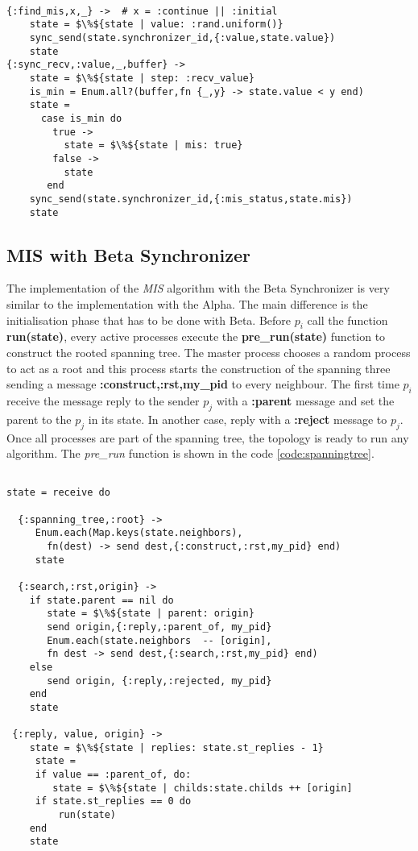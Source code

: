 \begin{lstlisting}[frame=single, columns=fullflexible, mathescape=true, caption= Synchronous communication by \textit{MIS} algorithm, label = code:sync_call]

{:find_mis,x,_} ->  # x = :continue || :initial
    state = $\%${state | value: :rand.uniform()}
    sync_send(state.synchronizer_id,{:value,state.value})
    state
{:sync_recv,:value,_,buffer} ->
    state = $\%${state | step: :recv_value}
    is_min = Enum.all?(buffer,fn {_,y} -> state.value < y end)
    state =
      case is_min do
        true ->
          state = $\%${state | mis: true}
        false ->
          state
       end
    sync_send(state.synchronizer_id,{:mis_status,state.mis})
    state

\end{lstlisting}

\subsection{MIS with Beta Synchronizer}

The implementation of the \textit{MIS} algorithm with the Beta Synchronizer is very similar to the implementation with the Alpha. The main difference is the initialisation phase that has to be done with Beta. Before $p_i$ call the function \textbf{run(state)}, every active processes execute the \textbf{pre\_run(state)} function to construct the rooted spanning tree. The master process chooses a random process to act as a root and this process starts the construction of the spanning three sending a message \textbf{{:construct,:rst,my\_pid}} to every neighbour. The first time $p_i$ receive the message reply to the sender $p_j$ with a \textbf{:parent} message and set the parent to the $p_j$ in its state. In another case, reply with a \textbf{:reject} message to $p_j$. Once all processes are part of the spanning tree, the topology is ready to run any algorithm. The \textit{pre\_run} function is shown in the code \ref{code:spanningtree}.


\begin{lstlisting}[frame=single, columns=fullflexible, mathescape=true, caption= Spanning Tree construction in Beta, label = code:spanningtree]

state = receive do

  {:spanning_tree,:root} ->
     Enum.each(Map.keys(state.neighbors),
       fn(dest) -> send dest,{:construct,:rst,my_pid} end)
 	 state

  {:search,:rst,origin} ->
 	if state.parent == nil do
 	   state = $\%${state | parent: origin}
 	   send origin,{:reply,:parent_of, my_pid}
       Enum.each(state.neighbors  -- [origin],
       fn dest -> send dest,{:search,:rst,my_pid} end)
 	else
 	   send origin, {:reply,:rejected, my_pid}
 	end
    state

 {:reply, value, origin} ->
    state = $\%${state | replies: state.st_replies - 1}
     state =
     if value == :parent_of, do:  
        state = $\%${state | childs:state.childs ++ [origin]
     if state.st_replies == 0 do
 	     run(state)
    end
 	state
    

\end{lstlisting}



